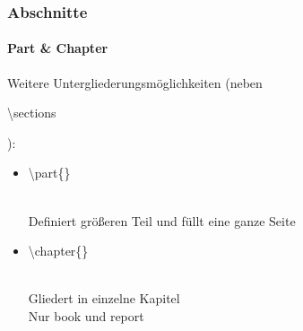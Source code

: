 
\begin{frame}
\frametitle{Abschnitte}
\framesubtitle{Part \& Chapter}

Weitere Untergliederungsmöglichkeiten (neben \begin{ttfamily}\color{unibablueI}\textbackslash section\color{black}s\end{ttfamily}):
\begin{itemize}
\item  \begin{ttfamily}\color{unibablueI}\textbackslash part\color{black}\{\}\end{ttfamily}\\
Definiert größeren Teil und füllt eine ganze Seite
\item \begin{ttfamily}\color{unibablueI}\textbackslash chapter\color{black}\{\}\end{ttfamily}\\
Gliedert in einzelne Kapitel\\
Nur {\ttfamily book} und {\ttfamily report}
\end{itemize}


\end{frame}


